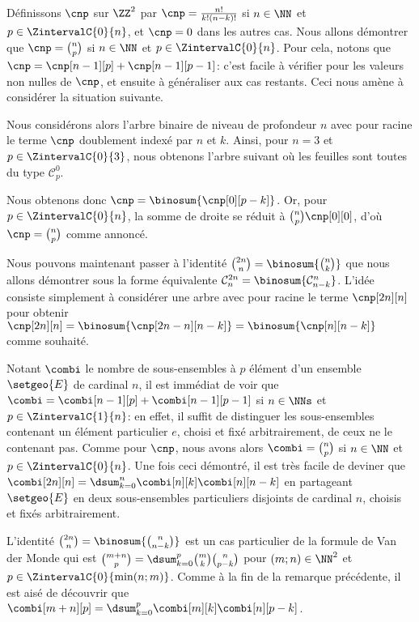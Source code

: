 Définissons $\cnp$ sur $\ZZ^2$ par
$\cnp = \frac{n!}{k!(n-k)!}$ si $n \in \NN$ et $p \in \ZintervalC{0}{n}$,
et
$\cnp = 0$ dans les autres cas.
%
Nous allons démontrer que $\cnp = \binom{n}{p}$ si $n \in \NN$ et $p \in \ZintervalC{0}{n}$.
%
Pour cela, notons que $\cnp = \cnp[n-1][p] + \cnp[n-1][p-1]$:
c'est facile à vérifier pour les valeurs non nulles de $\cnp$, et ensuite à généraliser aux cas restants.
Ceci nous amène à considérer la situation suivante.

\explaintree{\cnp}{\cnp[n-1][p]}{\cnp[n-1][p-1]}%
            {\factobinomintertree}{}

Nous considérons alors l'arbre binaire de niveau de profondeur $n$ avec pour racine le terme $\cnp$ doublement indexé par $n$ et $k$.
Ainsi, pour $n=3$ et $p \in \ZintervalC{0}{3}$, nous obtenons l'arbre suivant où les feuilles sont toutes du type $\mathcal{C}^0_p$.


Nous obtenons donc
$\cnp = \binosum{\cnp[0][p-k]}$.
Or, pour $p \in \ZintervalC{0}{n}$, la somme de droite se réduit à $\binom{n}{p} \cnp[0][0]$, d'où $\cnp = \binom{n}{p}$ comme annoncé.




Nous pouvons maintenant passer à l'identité
$\binom{2n}{n} = \binosum{\binom{n}{k}}$ que nous allons démontrer sous la forme équivalente
$\mathcal{C}^{2n}_n = \binosum{\mathcal{C}^n_{n-k}}$.
L'idée consiste simplement à considérer une arbre avec pour racine le terme $\cnp[2n][n]$ pour obtenir
$\cnp[2n][n] = \binosum{\cnp[2n - n][n-k]} = \binosum{\cnp[n][n-k]}$
comme souhaité.


\begin{remark}
	Notant $\combi$ le nombre de sous-ensembles à $p$ élément d'un ensemble $\setgeo{E}$ de cardinal $n$, il est immédiat de voir que
	$\combi = \combi[n-1][p] + \combi[n-1][p-1]$ si $n \in \NNs$ et $p \in \ZintervalC{1}{n}$:
	en effet, il suffit de distinguer les sous-ensembles contenant un élément particulier $e$, choisi et fixé arbitrairement, de ceux ne le contenant pas.
	Comme pour $\cnp$, nous avons alors $\combi = \binom{n}{p}$ si $n \in \NN$ et $p \in \ZintervalC{0}{n}$.
	Une fois ceci démontré, il est très facile de deviner que 
	$\combi[2n][n] = \dsum_{k=0}^{n} \combi[n][k] \combi[n][n-k]$
	en partageant $\setgeo{E}$ en deux sous-ensembles particuliers disjoints de cardinal $n$, choisis et fixés arbitrairement.
\end{remark}


\begin{remark}
	L'identité 
	$\binom{2n}{n} = \binosum{\binom{n}{n-k}}$
	est un cas particulier de la formule de Van der Monde qui est
	$\binom{m + n}{p} = \dsum_{k=0}^p \binom{m}{k} \binom{n}{p-k}$
	pour $(m ; n) \in \NN^2$ et $p \in \ZintervalC{0}{\min(n ; m)}$.
	Comme à la fin de la remarque précédente, il est aisé de découvrir que
	$\combi[m + n][p] = \dsum_{k=0}^p \combi[m][k] \combi[n][p-k]$. 
\end{remark}




